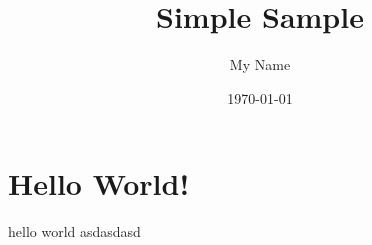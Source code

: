 \documentclass{article}
\title{Simple Sample}
\author{My Name}
\date{\today}
\begin{document}
\maketitle 

\section{Hello World!} 

hello world asdasdasd

\lipsum[1]
\end{document}
